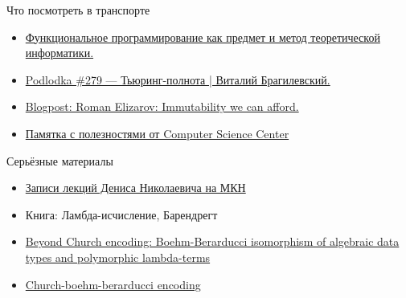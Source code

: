 
    \begin{frame}{Что посмотреть в транспорте}
        \begin{itemize}
            \item \href{https://youtu.be/oiUO1L4TOLI}{\color{blue} Функциональное программирование как предмет и метод теоретической информатики.}
            \item \href{https://youtu.be/YWelsG4mbik}{\color{blue} Podlodka \#279 --- Тьюринг-полнота | Виталий Брагилевский.}
            \item \href{https://elizarov.medium.com/immutability-we-can-afford-10c0dcb8351d}{\color{blue} Blogpost: Roman Elizarov: Immutability we can afford.}
            \item \href{https://compscicenter.notion.site/compscicenter/b6dddf00bc7d497298179a3bdbdda375}{\color{blue}Памятка с полезностями от Computer Science Center}
        \end{itemize}
    \end{frame}

    \begin{frame}{Серьёзные материалы}
        \begin{itemize}
            \item \href{https://www.youtube.com/playlist?list=PL-_cKNuVAYAVX_q9XOKoFm95234G6YfOj}{\color{blue} Записи лекций Дениса Николаевича на МКН}
            \item Книга: Ламбда-исчисление, Барендрегт
            \item \href{https://okmij.org/ftp/tagless-final/course/Boehm-Berarducci.html}{\color{blue} Beyond Church encoding: Boehm-Berarducci isomorphism of algebraic data types and polymorphic lambda-terms}
            \item \href{https://okmij.org/ftp/tagless-final/course/Boehm-Berarducci.html}{\color{blue} Church-boehm-berarducci encoding}
        \end{itemize}
    \end{frame}



